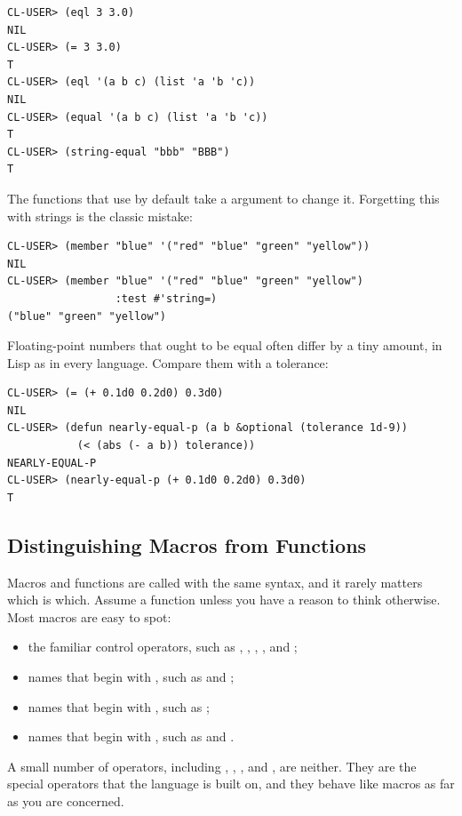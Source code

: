 \begin{verbatim}
CL-USER> (eql 3 3.0)
NIL
CL-USER> (= 3 3.0)
T
CL-USER> (eql '(a b c) (list 'a 'b 'c))
NIL
CL-USER> (equal '(a b c) (list 'a 'b 'c))
T
CL-USER> (string-equal "bbb" "BBB")
T
\end{verbatim}

The functions that use  by default take a 
argument to change it. Forgetting this with strings is the classic
mistake:

\begin{verbatim}
CL-USER> (member "blue" '("red" "blue" "green" "yellow"))
NIL
CL-USER> (member "blue" '("red" "blue" "green" "yellow")
                 :test #'string=)
("blue" "green" "yellow")
\end{verbatim}

Floating-point numbers that ought to be equal often differ by a tiny
amount, in Lisp as in every language. Compare them with a tolerance:

\begin{verbatim}
CL-USER> (= (+ 0.1d0 0.2d0) 0.3d0)
NIL
CL-USER> (defun nearly-equal-p (a b &optional (tolerance 1d-9))
           (< (abs (- a b)) tolerance))
NEARLY-EQUAL-P
CL-USER> (nearly-equal-p (+ 0.1d0 0.2d0) 0.3d0)
T
\end{verbatim}

\subsection{Distinguishing Macros from Functions}

Macros and functions are called with the same syntax, and it rarely
matters which is which. Assume a function unless you have a reason to
think otherwise. Most macros are easy to spot:

\begin{itemize}
\item the familiar control operators, such as ,
, , ,  and ;
\item names that begin with , such as  and
;
\item names that begin with , such as
;
\item names that begin with , such as  and
.
\end{itemize}

A small number of operators, including , ,
,  and , are neither. They are the
special operators that the language is built on, and they behave like
macros as far as you are concerned.

